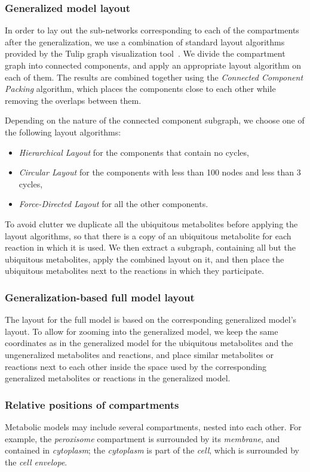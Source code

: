 \documentclass{bmcart}
\begin{document}
\subsubsection*{Generalized model layout}
In order to lay out the sub-networks corresponding to each of the compartments after the generalization, we use a combination of standard layout algorithms provided by the Tulip graph visualization tool~\cite{Auber04}. We divide the compartment graph into connected components, and apply an appropriate layout algorithm on each of them. The results are combined together using the \emph{Connected Component Packing} algorithm, which places the components close to each other while removing the overlaps between them.

Depending on the nature of the connected component subgraph, we choose one of the following layout algorithms:
\begin{itemize}
\item \emph{Hierarchical Layout} for the components that contain no cycles,
\item \emph{Circular Layout} for the components with less than 100 nodes and less than 3 cycles,
\item \emph{Force-Directed Layout} for all the other components.
\end{itemize}

To avoid clutter we duplicate all the ubiquitous metabolites before applying the layout algorithms, so that there is a copy of an ubiquitous metabolite for each reaction in which it is used. We then extract a subgraph, containing all but the ubiquitous metabolites, apply the combined layout on it, and then place the ubiquitous metabolites next to the reactions in which they participate.

\subsubsection*{Generalization-based full model layout}
The layout for the full model is based on the corresponding generalized model's layout. To allow for zooming into the generalized model, we keep the same coordinates as in the generalized model for the ubiquitous metabolites and the ungeneralized metabolites and reactions, and place similar metabolites or reactions next to each other inside the space used by the corresponding generalized metabolites or reactions in the generalized model.

\subsubsection*{Relative positions of compartments}
Metabolic models may include several compartments, nested into each other. For example, the \emph{peroxisome} compartment is surrounded by its \emph{membrane}, and contained in \emph{cytoplasm}; the \emph{cytoplasm} is part of the \emph{cell}, which is surrounded by the \emph{cell envelope}.
\end{document}
